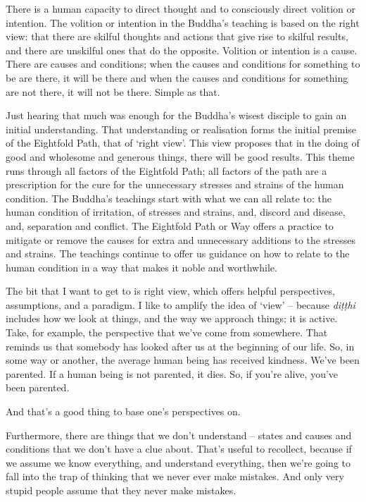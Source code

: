 There is a human capacity to direct thought and to consciously direct volition
or intention. The volition or intention in the Buddha's teaching is based on the
right view: that there are skilful thoughts and actions that give rise to
skilful results, and there are unskilful ones that do the opposite. Volition or
intention is a cause. There are causes and conditions; when the causes and
conditions for something to be are there, it will be there and when the causes
and conditions for something are not there, it will not be there. Simple as that.

\enlargethispage*{\baselineskip}

Just hearing that much was enough for the Buddha's wisest disciple to gain an
initial understanding. That understanding or realisation forms the initial
premise of the Eightfold Path, that of `right view'. This view proposes that in
the doing of good and wholesome and generous things, there will be good results.
This theme runs through all factors of the Eightfold Path; all factors of the
path are a prescription for the cure for the unnecessary stresses and strains of
the human condition. The Buddha's teachings start with what we can
all relate to: the human condition of irritation, of stresses and strains, and,
discord and disease, and, separation and conflict. The Eightfold Path or Way
offers a practice to mitigate or remove the causes for extra and unnecessary
additions to the stresses and strains. The teachings continue to offer
us guidance on how to relate to the human condition in a way that makes it
noble and worthwhile.

The bit that I want to get to is right view, which offers helpful perspectives,
assumptions, and a paradigm. I like to amplify the idea of `view' -- because
\emph{diṭṭhi} includes how we look at things, and the way we approach things; it
is active. Take, for example, the perspective that we've come from somewhere.
That reminds us that somebody has looked after us at the beginning of our life.
So, in some way or another, the average human being has received kindness. We've
been parented. If a human being is not parented, it dies. So, if you're alive,
you've been parented.

And that's a good thing to base one's perspectives on.

Furthermore, there are things that we don't understand -- states and causes and
conditions that we don't have a clue about. That's useful to recollect, because
if we assume we know everything, and understand everything, then we're going to
fall into the trap of thinking that we never ever make mistakes. And only very
stupid people assume that they never make mistakes.

